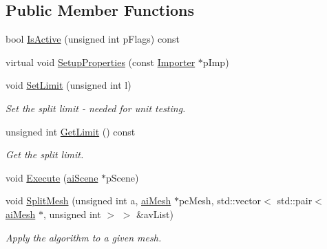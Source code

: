 \subsection*{Public Member Functions}
\begin{DoxyCompactItemize}
\item 
bool \hyperlink{class_assimp_1_1_split_large_meshes_process___triangle_ad11c84df09a22cf3391658700d38ca34}{Is\+Active} (unsigned int p\+Flags) const 
\item 
virtual void \hyperlink{class_assimp_1_1_split_large_meshes_process___triangle_ac4f6a0e2f06e539084bd5aa025ad1cf6}{Setup\+Properties} (const \hyperlink{class_assimp_1_1_importer}{Importer} $\ast$p\+Imp)
\item 
\hypertarget{class_assimp_1_1_split_large_meshes_process___triangle_a4d1b8728a26f7877138cca85c6031229}{void \hyperlink{class_assimp_1_1_split_large_meshes_process___triangle_a4d1b8728a26f7877138cca85c6031229}{Set\+Limit} (unsigned int l)}\label{class_assimp_1_1_split_large_meshes_process___triangle_a4d1b8728a26f7877138cca85c6031229}

\begin{DoxyCompactList}\small\item\em Set the split limit -\/ needed for unit testing. \end{DoxyCompactList}\item 
\hypertarget{class_assimp_1_1_split_large_meshes_process___triangle_a6413849ca561bb6fa6f9feaa0c4e5b0a}{unsigned int \hyperlink{class_assimp_1_1_split_large_meshes_process___triangle_a6413849ca561bb6fa6f9feaa0c4e5b0a}{Get\+Limit} () const }\label{class_assimp_1_1_split_large_meshes_process___triangle_a6413849ca561bb6fa6f9feaa0c4e5b0a}

\begin{DoxyCompactList}\small\item\em Get the split limit. \end{DoxyCompactList}\item 
void \hyperlink{class_assimp_1_1_split_large_meshes_process___triangle_ab8be64f18fe7379f1ff2664a4e0d9c34}{Execute} (\hyperlink{structai_scene}{ai\+Scene} $\ast$p\+Scene)
\item 
\hypertarget{class_assimp_1_1_split_large_meshes_process___triangle_a3e962ff9c120def95f62001f27bc7577}{void \hyperlink{class_assimp_1_1_split_large_meshes_process___triangle_a3e962ff9c120def95f62001f27bc7577}{Split\+Mesh} (unsigned int a, \hyperlink{structai_mesh}{ai\+Mesh} $\ast$pc\+Mesh, std\+::vector$<$ std\+::pair$<$ \hyperlink{structai_mesh}{ai\+Mesh} $\ast$, unsigned int $>$ $>$ \&av\+List)}\label{class_assimp_1_1_split_large_meshes_process___triangle_a3e962ff9c120def95f62001f27bc7577}

\begin{DoxyCompactList}\small\item\em Apply the algorithm to a given mesh. \end{DoxyCompactList}\end{DoxyCompactItemize}
